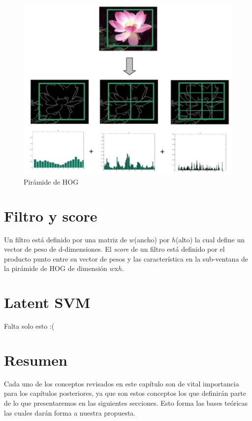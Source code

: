 \begin{figure}[tb]
  \centering
   \includegraphics[width=1\textwidth]{Figuras/phog.jpg}
   \caption{Pirámide de HOG~\cite{pyra}}
   \label{fig:hog_pyra}
\end{figure}

\section{Filtro y score}\label{sec:fas}

Un filtro está definido por una matriz de $w$(ancho) por $h$(alto) la cual define un vector de peso de d-dimensiones. El \textit{score} de un filtro está definido por el producto punto entre su vector de pesos y las característica en la sub-ventana de la pirámide de HOG de dimensión $w$x$h$.
\section{Latent SVM}\label{sec:lsvm}

Falta solo esto :(
\section{Resumen}\label{sec:resumen}

Cada uno de los conceptos revisados en este capítulo son de vital importancia para los capítulos posteriores, ya que son estos conceptos los que definirán parte de lo que presentaremos en las siguientes secciones. Esto forma las bases teóricas las cuales darán forma a nuestra propuesta.